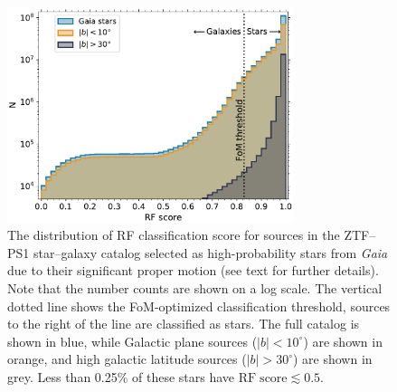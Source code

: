 \documentclass[twocolumn, dvipdfmx]{aastex62}
\begin{document}
\begin{CJK*}{UTF8}{gbsn}
\begin{figure}[htb]
 \centering
  \includegraphics[width=3.3in]{./Figures/Gaia_PS1_pm_hist.pdf}
  \caption{ 
  The distribution of RF classification score for sources in the ZTF--PS1
  star--galaxy catalog selected as high-probability stars from \textit{Gaia}
  due to their significant proper motion (see text for further details).
  Note that the number counts are shown on a log scale. The vertical dotted
  line shows the FoM-optimized classification threshold, sources to the
  right of the line are classified as stars. The full catalog is shown in
  blue, while Galactic plane sources ($|b| < 10^{\circ}$) are shown in
  orange, and high galactic latitude sources ($|b| > 30^{\circ}$) are shown
  in grey. Less than 0.25\% of these stars have $\mathrm{RF\;score} \lesssim
  0.5$.
  }
  \label{fig:gaia}
\end{figure}


\end{CJK*}
\end{document}
